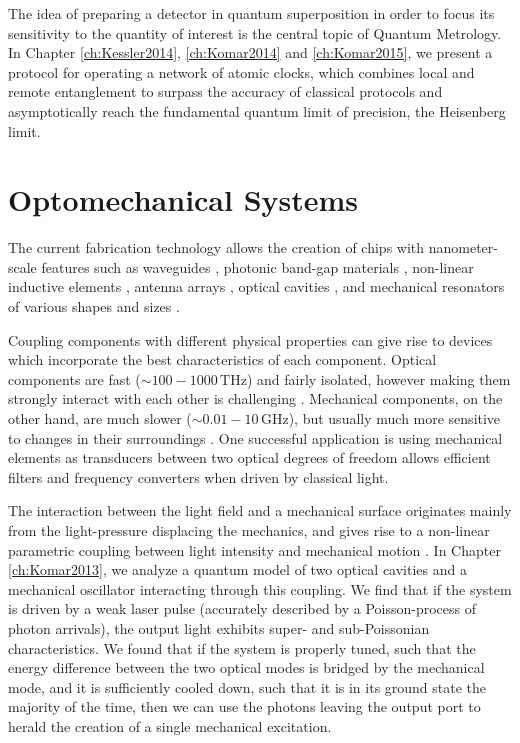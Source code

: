 The idea of preparing a detector in quantum
superposition in order to focus its sensitivity to the quantity of interest is
the central topic of Quantum Metrology. In Chapter \ref{ch:Kessler2014},
\ref{ch:Komar2014} and \ref{ch:Komar2015}, we present a
protocol for operating a network of atomic clocks, which combines local and
remote entanglement to surpass the accuracy of classical protocols and
asymptotically reach the fundamental quantum limit of precision, the Heisenberg limit. 


 
 
 
 
 
 
\section{Optomechanical Systems}
The current fabrication technology allows the creation of chips with
nanometer-scale features such as waveguides \cite{Mekis1996}, photonic band-gap
materials \cite{Foresi1997}, non-linear inductive elements \cite{Makhlin1999},
antenna arrays \cite{Yu2014}, optical cavities \cite{Painter2001}, and
mechanical resonators of various shapes and sizes \cite{Aspelmeyer2014}.

Coupling components with different physical properties can give rise to devices
which incorporate the best characteristics of each component.
Optical components are fast ($\sim 100-1000\,\mathrm{THz}$) and fairly isolated,
however making them strongly interact with each other is challenging
\cite{Chang2007}.
Mechanical components, on the other hand, are much slower ($\sim
0.01-10\,\mathrm{GHz}$), but usually much more sensitive to changes in their
surroundings \cite{Aspelmeyer2014}. One successful application is using
mechanical elements as transducers between two optical degrees of freedom allows efficient filters and frequency
converters \cite{Eichenfield2009} when driven by classical light.

The interaction between the light field and a mechanical surface originates
mainly from the light-pressure displacing the mechanics, and gives rise to a
non-linear parametric coupling between light intensity and mechanical motion
\cite{Meystre2013}. In Chapter \ref{ch:Komar2013}, we analyze a quantum model of
two optical cavities and a mechanical oscillator interacting through this
coupling. We find that if the system is driven by a weak laser pulse (accurately
described by a Poisson-process of photon arrivals), the output light exhibits
super- and sub-Poissonian characteristics.
We found that if the system is properly tuned, such that the energy difference
between the two optical modes is bridged by the mechanical mode, and it is
sufficiently cooled down, such that it is in its ground state the majority of
the time, then we can use the photons leaving the output port to herald the
creation of a single mechanical excitation.

